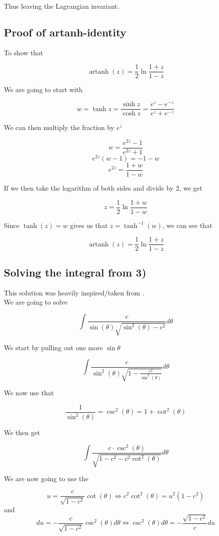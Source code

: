 \documentclass[a4paper,norsk, 10pt]{article}
\DeclareMathOperator\artanh{artanh}
\begin{document}
Thus leaving the Lagrangian invariant.
\label{subsec:invariance}

\subsection{Proof of artanh-identity}

To show that

$$
\artanh (z) = \frac{1}{2} \ln \frac{1+z}{1-z}
$$

We are going to start with 

$$
w = \tanh z = \frac{\sinh z}{\cosh z} = \frac{e^z - e^{-z}}{e^z + e^{-z}}
$$

We can then multiply the fraction by $e^z$

$$
w = \frac{e^{2z} -1 }{e^{2z}+1}
$$
$$
e^{2z}(w-1) = -1-w 
$$
$$
e^{2z} = \frac{1+w}{1-w}
$$

If we then take the logarithm of both sides and divide by 2, we get

$$
z = \frac{1}{2}\ln \frac{1+w}{1-w}
$$

Since $\tanh (z) = w$ gives us that $z = \tanh^{-1} (w)$, we can see that

$$
\artanh (z) = \frac{1}{2}\ln \frac{1+z}{1-z}
$$
\label{subsec:artanh}

\subsection{Solving the integral from 3)}

This solution was heavily inspired/taken from \cite{triks}.\\

We are going to solve

$$
 \int\frac{c}{\sin(\theta) \sqrt{\sin^2(\theta) - c^2}} d\theta 
$$

We start by pulling out one more $\sin\theta$

$$
 \int \frac{c}{\sin^2(\theta) \sqrt{1 - \frac{c^2}{\sin^2(\theta)}}} d\theta 
$$

We now use that

$$
\frac{1}{\sin^2(\theta)} = \csc^2(\theta) = 1 + \cot^2(\theta)
$$

We then get

$$
 \int \frac{c\cdot\csc^2(\theta)}{\sqrt{1 - c^2 - c^2\cot^2(\theta)}} d\theta 
$$

We are now going to use the 

$$
u = \frac{c}{{\sqrt{1-c^2}}}\cot(\theta) \Leftrightarrow c^2\cot^2(\theta) = u^2(1-c^2)
$$
and
$$
du = -\frac{c}{\sqrt{1-c^2}}\csc^2(\theta) d\theta \Leftrightarrow \csc^2(\theta) d\theta  = -\frac{\sqrt{1-c^2}}{c}du
$$
\end{document}
